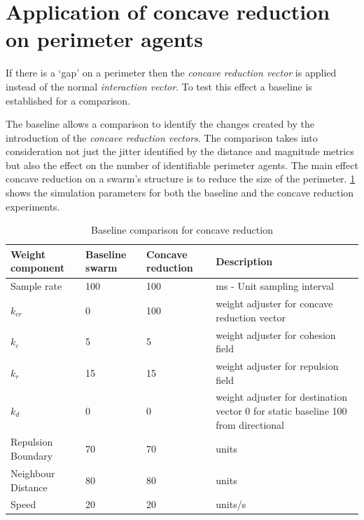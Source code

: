 \documentclass{ieeeaccess}
\begin{document}
\section{Application of concave reduction on perimeter agents}
If there is a `gap' on a perimeter then the \textit{concave reduction vector} is applied instead of the normal \textit{interaction vector}. To test this effect a baseline is established for a comparison.

The baseline allows a comparison to identify the changes created by the introduction of the \textit{concave reduction vectors}. The comparison takes into consideration not just the jitter identified by the distance and magnitude metrics but also the effect on the number of identifiable perimeter agents. The main effect concave reduction on a swarm's structure is to reduce the size of the perimeter. \ref{tab:BaselineConcaveReduction} shows the simulation parameters for both the baseline and the concave reduction experiments.

\begin{table}
\caption{Baseline comparison for concave reduction} 
\label{tab:BaselineConcaveReduction}
\begin{center}
\begin{tabular}{| p{1.4cm} | p{1.2cm} | p{1.2cm} | p{2.5cm} |}
\hline
\bf Weight \bf component & \bf Baseline \bf swarm & \bf Concave \bf reduction & \bf Description \\ \hline
Sample rate & 100 & 100 & ms - Unit sampling interval\\  \hline
$k_{cr}$ & 0 & 100 & weight adjuster for concave reduction vector\\  \hline
$k_c$ & 5 & 5 & weight adjuster for cohesion field\\  \hline
$k_r$ & 15 & 15 & weight adjuster for repulsion field\\  \hline
$k_d$ & 0 & 0 & weight adjuster for destination vector 0 for static baseline 100 from directional\\  \hline
Repulsion Boundary & 70 & 70 & units\\  \hline
Neighbour Distance & 80 & 80 & units\\  \hline
Speed & 20 & 20 & units/s\\  \hline
\end{tabular}
\end{center}
\end{table}
\end{document}

